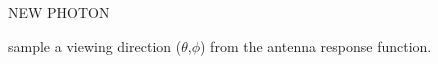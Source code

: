 \begin{minipage}{7cm}
\begin{sf}
NEW PHOTON 

sample a viewing direction ($\theta$,$\phi$) from the antenna response function.

\end{sf}
\end{minipage}
